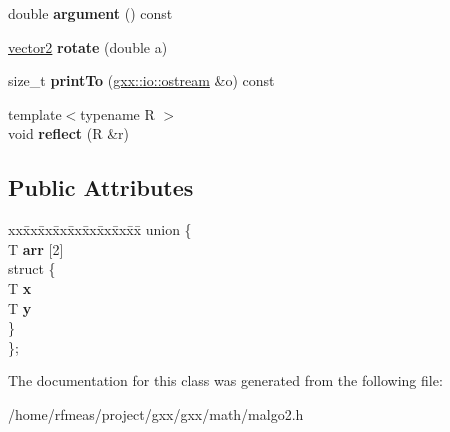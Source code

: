 \begin{DoxyCompactItemize}
\item 
double {\bfseries argument} () const \hypertarget{classmalgo_1_1vector2_a4762b426b68646b88a352f485a69ffa7}{}\label{classmalgo_1_1vector2_a4762b426b68646b88a352f485a69ffa7}

\item 
\hyperlink{classmalgo_1_1vector2}{vector2} {\bfseries rotate} (double a)\hypertarget{classmalgo_1_1vector2_a2cca586c391fe96f06a87ad7eeeb05d4}{}\label{classmalgo_1_1vector2_a2cca586c391fe96f06a87ad7eeeb05d4}

\item 
size\+\_\+t {\bfseries print\+To} (\hyperlink{classgxx_1_1io_1_1ostream}{gxx\+::io\+::ostream} \&o) const \hypertarget{classmalgo_1_1vector2_aedf12dcfe044426c8d661ced8ef9660c}{}\label{classmalgo_1_1vector2_aedf12dcfe044426c8d661ced8ef9660c}

\item 
{\footnotesize template$<$typename R $>$ }\\void {\bfseries reflect} (R \&r)\hypertarget{classmalgo_1_1vector2_a9450dc31ff95f8c0c378da534db3f71f}{}\label{classmalgo_1_1vector2_a9450dc31ff95f8c0c378da534db3f71f}

\end{DoxyCompactItemize}
\subsection*{Public Attributes}
\begin{DoxyCompactItemize}
\item 
\begin{tabbing}
xx\=xx\=xx\=xx\=xx\=xx\=xx\=xx\=xx\=\kill
union \{\\
\>T {\bfseries arr} \mbox{[}2\mbox{]}\\
\>struct \{\\
\>\>T {\bfseries x}\\
\>\>T {\bfseries y}\\
\>\} \hypertarget{unionmalgo_1_1vector2_1_1_0D9_a10b2c933c7177147c0823b4ea0dfb44d}{}\label{unionmalgo_1_1vector2_1_1_0D9_a10b2c933c7177147c0823b4ea0dfb44d}
\\
\}; \hypertarget{classmalgo_1_1vector2_a3b6dbff2d4a89b71908e38d22165fd22}{}\label{classmalgo_1_1vector2_a3b6dbff2d4a89b71908e38d22165fd22}
\\

\end{tabbing}\end{DoxyCompactItemize}


The documentation for this class was generated from the following file\+:\begin{DoxyCompactItemize}
\item 
/home/rfmeas/project/gxx/gxx/math/malgo2.\+h\end{DoxyCompactItemize}
